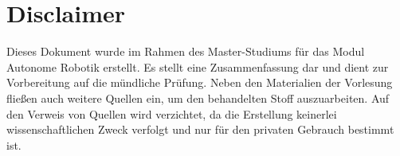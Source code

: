 \documentclass[11pt]{scrartcl}
\begin{document}














\section*{Disclaimer}
Dieses Dokument wurde im Rahmen des Master-Studiums
für das Modul \glqq Autonome Robotik\grqq{} erstellt. Es stellt eine 
Zusammenfassung dar und dient zur Vorbereitung auf die
mündliche Prüfung. Neben den Materialien der Vorlesung
fließen auch weitere Quellen ein, um den behandelten Stoff
auszuarbeiten. Auf den Verweis von Quellen wird verzichtet,
da die Erstellung keinerlei wissenschaftlichen Zweck verfolgt
und nur für den privaten Gebrauch bestimmt ist.
\end{document}
